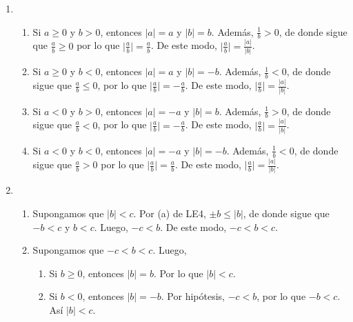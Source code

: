 \documentclass[11pt]{article}
\begin{document}
\begin{enumerate}[label=\alph*)]

    \item 
        \begin{enumerate}[label=\roman*)]
            \item Si $a \geq 0$ y $b>0$, entonces $|a|=a$ y $|b|=b$. Además, $\frac{1}{b} >0$, de donde sigue que $\frac{a}{b} \geq 0$ por lo que $\big| \frac{a}{b} \big| = \frac{a}{b}$. De este modo, $ \big| \frac{a}{b} \big| = \frac{|a|}{|b|}$.
            \item Si $a \geq 0$ y $b<0$, entonces $|a|=a$ y $|b|=-b$. Además, $\frac{1}{b} <0$, de donde sigue que $\frac{a}{b} \leq 0$, por lo que $\big| \frac{a}{b} \big| =- \frac{a}{b}$. De este modo, $ \big| \frac{a}{b} \big| = \frac{|a|}{|b|}$.
            \item Si $a<0$ y $b>0$, entonces $|a|=-a$ y $|b|=b$. Además, $\frac{1}{b} >0$, de donde sigue que $\frac{a}{b} < 0$, por lo que $\big| \frac{a}{b} \big| =- \frac{a}{b}$. De este modo, $ \big| \frac{a}{b} \big| = \frac{|a|}{|b|}$.
            \item Si $a<0$ y $b<0$, entonces $|a|=-a$ y $|b|=-b$. Además, $\frac{1}{b} <0$, de donde sigue que $\frac{a}{b} > 0$ por lo que $\big| \frac{a}{b} \big| = \frac{a}{b}$. De este modo, $ \big| \frac{a}{b} \big| = \frac{|a|}{|b|}$.
        \end{enumerate}

        
    \item
        \begin{enumerate}[label=\roman*)]
            \item Supongamos que $|b|<c$. Por (a) de LE4, $ \pm b \leq |b|$, de donde sigue que $-b<c$ y $b<c$. Luego, $-c<b$. De este modo, $-c<b<c$.
            \item Supongamos que $-c<b<c$. Luego,
                \begin{enumerate}[label=\arabic*)]
                    \item Si $b \geq 0$, entonces $|b|=b$. Por lo que $|b|<c$.
                    \item Si $b < 0$, entonces $|b|=-b$. Por hipótesis, $-c<b$, por lo que $-b<c$. Así $|b|<c$.
                \end{enumerate}
        \end{enumerate}
    


\end{enumerate}
\end{document}

